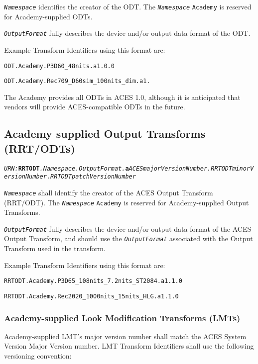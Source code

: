 \texttt{\textit{Namespace}} identifies the creator of the ODT. The \texttt{\textit{Namespace}} \texttt{Academy} is reserved for Academy-supplied ODTs.

\texttt{\textit{OutputFormat}} fully describes the device and/or output data format of the ODT.

Example Transform Identifiers using this format are:
\begin{listize}
	\item {\small \texttt{\urn{}ODT.Academy.P3D60\_48nits.a1.0.0}}
	\item {\small \texttt{\urn{}ODT.Academy.Rec709\_D60sim\_100nits\_\+dim.\+a1.}}
\end{listize}

The Academy provides all ODTs in ACES 1.0, although it is anticipated that vendors will provide ACES-compatible ODTs in the future.

\subsection{Academy supplied Output Transforms (RRT/ODTs)} \label{sec:ot}

\begin{sloppypar}
\texttt{\textit{URN:}\textbf{RRTODT}\textit{.Namespace.OutputFormat.\+}\textbf{a}\textit{ACESmajorVersionNumber.\+RRTODTminor\+Version\+Number.RRTODTpatchVersion\+Number}}
\end{sloppypar}

\texttt{\textit{Namespace}} shall identify the creator of the ACES Output Transform (RRT/ODT). The \texttt{\textit{Namespace}} \texttt{Academy} is reserved for Academy-supplied Output Transforms.

\texttt{\textit{OutputFormat}} fully describes the device and/or output data format of the ACES Output Transform, and should use the \texttt{\textit{OutputFormat}} associated with the Output Transform used in the transform. 

Example Transform Identifiers using this format are:
\begin{listize}
	\item {\small \texttt{\urn{}RRTODT.Academy.P3D65\_108nits\_7.2nits\_\+ST2084.\+a1.1.0}}
	\item {\small \texttt{\urn{}RRTODT.Academy.Rec2020\_1000nits\_15nits\_\+HLG.\+a1.1.0}}
\end{listize}

\subsubsection{Academy-supplied Look Modification Transforms (LMTs)}
Academy-supplied LMT's major version number shall match the ACES System Version Major Version number. LMT Transform Identifiers shall use the following versioning convention:

